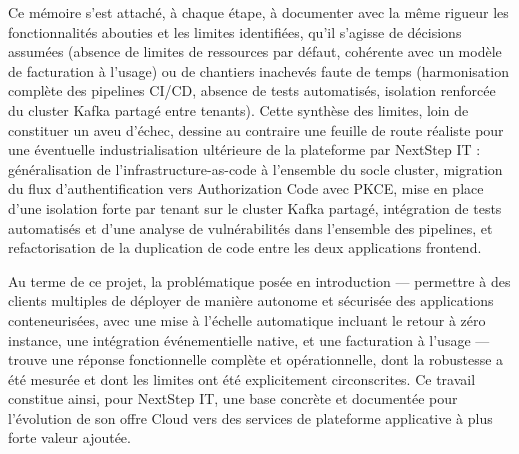 Ce mémoire s'est attaché, à chaque étape, à documenter avec la même rigueur les fonctionnalités abouties et les limites identifiées, qu'il s'agisse de décisions assumées (absence de limites de ressources par défaut, cohérente avec un modèle de facturation à l'usage) ou de chantiers inachevés faute de temps (harmonisation complète des pipelines CI/CD, absence de tests automatisés, isolation renforcée du cluster Kafka partagé entre tenants). Cette synthèse des limites, loin de constituer un aveu d'échec, dessine au contraire une feuille de route réaliste pour une éventuelle industrialisation ultérieure de la plateforme par NextStep IT : généralisation de l'infrastructure-as-code à l'ensemble du socle cluster, migration du flux d'authentification vers Authorization Code avec PKCE, mise en place d'une isolation forte par tenant sur le cluster Kafka partagé, intégration de tests automatisés et d'une analyse de vulnérabilités dans l'ensemble des pipelines, et refactorisation de la duplication de code entre les deux applications frontend.

Au terme de ce projet, la problématique posée en introduction — permettre à des clients multiples de déployer de manière autonome et sécurisée des applications conteneurisées, avec une mise à l'échelle automatique incluant le retour à zéro instance, une intégration événementielle native, et une facturation à l'usage — trouve une réponse fonctionnelle complète et opérationnelle, dont la robustesse a été mesurée et dont les limites ont été explicitement circonscrites. Ce travail constitue ainsi, pour NextStep IT, une base concrète et documentée pour l'évolution de son offre Cloud vers des services de plateforme applicative à plus forte valeur ajoutée.
